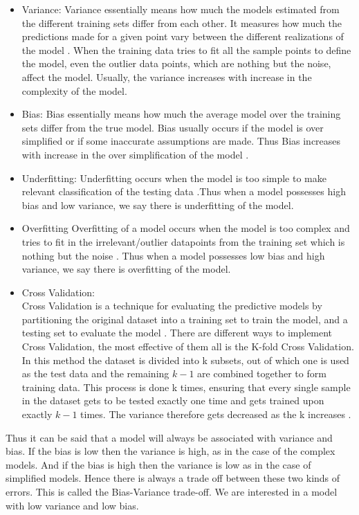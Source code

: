 \begin{itemize}
    \item Variance:
    Variance essentially means how much the models estimated from the different training sets differ from each other. It measures how much the predictions made for a given point vary between the different realizations of the model \cite{link17}. When the training data tries to fit all the sample points to define the model, even the outlier data points, which are nothing but the noise, affect the model. Usually, the variance increases with increase in the complexity of the model.
    \item Bias:
    Bias essentially means how much the average model over the training sets differ from the true model. Bias usually occurs if the model is over simplified or if some inaccurate assumptions are made. Thus Bias increases with increase in the over simplification of the model \cite{link17}.
    \item Underfitting:
    Underfitting occurs when the model is too simple to make relevant classification of the testing data \cite{link17}.Thus when a model possesses high bias and low variance, we say there is underfitting of the model.
    \item Overfitting
    Overfitting of a model occurs when the model is too complex and tries to fit in the irrelevant/outlier datapoints from the training set which is nothing but the noise \cite{link17}. Thus when a model possesses low bias and high variance, we say there is overfitting of the model.
    \item Cross Validation: \\
    Cross Validation is a technique for evaluating the predictive models by partitioning the original dataset into a training set to train the model, and a testing set to evaluate the model \cite{link16}. There are different ways to implement Cross Validation, the most effective of them all is the K-fold Cross Validation. In this method the dataset is divided into k subsets, out of which one is used as the test data and the remaining $k-1$ are combined together to form training data. This process is done k times, ensuring that every single sample in the dataset gets to be tested exactly one time and gets trained upon exactly $k-1$ times. The variance therefore gets decreased as the k increases \cite{link16}.
\end{itemize}

Thus it can be said that a model will always be associated with variance and bias. If the bias is low then the variance is high, as in the case of the complex models. And if the bias is high then the variance is low as in the case of simplified models. Hence there is always a trade off between these two kinds of errors. This is called the Bias-Variance trade-off. We are interested in a model with low variance and low bias.


